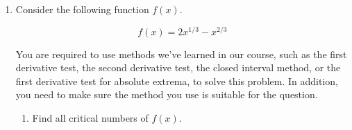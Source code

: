 \documentclass[11pt]{article}
\begin{document}
\begin{enumerate}
\begin{enumerate}
\begin{enumerate}
        {\large
        \[\text{Inflection points ($x$-value(s) only): } \rule[-8pt]{3in}{0.4pt}\]
        }

        \vfill
    \end{enumerate}

    \item A function $f$ satisfies that $f(3)=5$, $f'(3)=2$, and $f''>0$ for $x>3$. Which one(s) of the following are possible values of $f(5)$? 
    
    Select all that apply. No justification required. Correct answer gets full credit. 

    \begin{itemize}
        \item 10
        \item 7
        \item 12
        \item 9
    \end{itemize}

    \vfill
    \vfill
\end{enumerate}


\newpage


\item Consider the following function $f(x)$.%

\[f(x)=2x^{1/3}-x^{2/3}\]%


You are required to use methods we've learned in our course, such as the first derivative test, the second derivative test, the closed interval method, or the first derivative test for absolute extrema, to solve this problem. In addition, you need to make sure the method you use is suitable for the question.

\begin{enumerate}
    \item Find all critical numbers of $f(x)$.

    \vfill



\end{enumerate}
\end{enumerate}
\end{document}
